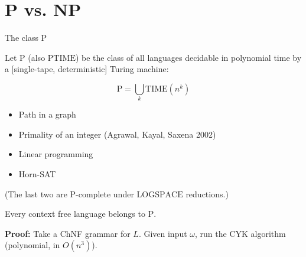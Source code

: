 \documentclass[handout]{beamer}
\begin{document}
\section*{P vs. NP}


\begin{frame}{The class P}

    \begin{definition}
        Let \alert{$\mathrm{P}$} (also \alert{$\mathrm{PTIME}$}) be the class of all languages decidable in \alert{polynomial time} by a [single-tape, deterministic] Turing machine:

        \vspace{-18pt}
        $$
        \mathrm{P}=\bigcup_k \mathrm{TIME}(n^k)
        $$
        \vspace{-9pt}
    \end{definition}
    \vspace{-9pt}
    \begin{itemize}
        \item Path in a graph
        \item Primality of an integer (Agrawal, Kayal, Saxena 2002)
        \item Linear programming
        \item Horn-SAT
    \end{itemize}
    \vspace{-3pt}
    (The last two are $\mathrm{P}$-complete under $\mathrm{LOGSPACE}$ reductions.)

    \medskip

    \begin{theorem}
        Every context free language belongs to $\mathrm{P}$.
    \end{theorem}  
    
    \vspace{-10pt}
    \textbf{Proof:}
        Take a ChNF grammar for $L$. Given input $\omega$, run the CYK algorithm (polynomial, in $O(n^3)$).\hfill\qedsymbol

\end{frame}
\end{document}
